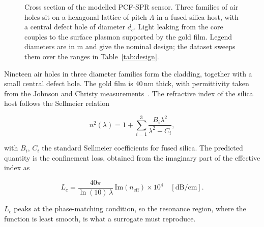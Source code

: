 \documentclass[iicol,pdflatex,sn-basic,Numbered]{sn-jnl}
\begin{document}
\begin{figure}[t]
{}
\caption{Cross section of the modelled PCF-SPR sensor. Three families of air
holes sit on a hexagonal lattice of pitch $\Lambda$ in a fused-silica host, with
a central defect hole of diameter $d_c$. Light leaking from the core couples to
the surface plasmon supported by the gold film. Legend diameters are in
\textmu m and give the nominal design; the dataset sweeps them over the ranges
in Table~\ref{tab:design}.}\label{fig:cross_section}
\end{figure}

Nineteen air holes in three diameter families form the cladding, together with a
small central defect hole. The gold film is 40\,nm thick, with permittivity taken
from the Johnson and Christy measurements~\cite{johnson1972}. The refractive index
of the silica host follows the Sellmeier relation~\cite{rifat2017}

\begin{equation}
n^2(\lambda) = 1 + \sum_{i=1}^{3} \frac{B_i\lambda^2}{\lambda^2 - C_i},
\label{eq:sellmeier}
\end{equation}

with $B_i$, $C_i$ the standard Sellmeier coefficients for fused silica. The
predicted quantity is the confinement loss, obtained from the imaginary part of
the effective index as~\cite{zelaci2021}

\begin{equation}
L_c = \frac{40\pi}{\ln(10)\,\lambda}\,\mathrm{Im}(n_\mathrm{eff})\times 10^{4}
\quad [\mathrm{dB/cm}].
\label{eq:confinement_loss}
\end{equation}

$L_c$ peaks at the phase-matching condition, so the resonance region, where the
function is least smooth, is what a surrogate must reproduce.
\end{document}
